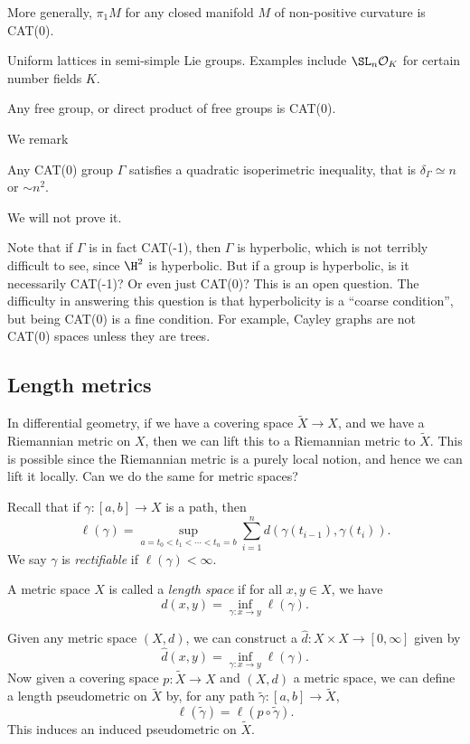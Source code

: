 \documentclass[a4paper]{article}
\begin{document}
\begin{eg}
  More generally, $\pi_1 M$ for any closed manifold $M$ of non-positive curvature is CAT(0).
\end{eg}

\begin{eg}
  Uniform lattices in semi-simple Lie groups. Examples include $\SL_n \mathcal{O}_K$ for certain number fields $K$.
\end{eg}
\begin{eg}
  Any free group, or direct product of free groups is CAT(0).
\end{eg}

We remark
\begin{prop}
  Any CAT(0) group $\Gamma$ satisfies a quadratic isoperimetric inequality, that is $\delta_\Gamma \simeq n$ or $\sim n^2$.
\end{prop}
We will not prove it.

Note that if $\Gamma$ is in fact CAT(-1), then $\Gamma$ is hyperbolic, which is not terribly difficult to see, since $\H^2$ is hyperbolic. But if a group is hyperbolic, is it necessarily CAT(-1)? Or even just CAT(0)? This is an open question. The difficulty in answering this question is that hyperbolicity is a ``coarse condition'', but being CAT(0) is a fine condition. For example, Cayley graphs are not CAT(0) spaces unless they are trees.

\subsection{Length metrics}
In differential geometry, if we have a covering space $\tilde{X} \to X$, and we have a Riemannian metric on $X$, then we can lift this to a Riemannian metric to $\tilde{X}$. This is possible since the Riemannian metric is a purely local notion, and hence we can lift it locally. Can we do the same for metric spaces?

Recall that if $\gamma: [a, b] \to X$ is a path, then
\[
  \ell(\gamma) = \sup_{a = t_0 < t_1 < \cdots < t_n = b} \sum_{i = 1}^n d(\gamma(t_{i - 1}), \gamma(t_i)).
\]
We say $\gamma$ is \emph{rectifiable} if $\ell(\gamma) < \infty$.

\begin{defi}
  A metric space $X$ is called a \emph{length space} if for all $x, y \in X$, we have
  \[
    d(x, y) = \inf_{\gamma: x \to y} \ell(\gamma).
  \]
\end{defi}
Given any metric space $(X, d)$, we can construct a  $\hat{d}: X \times X \to [0, \infty]$ given by
\[
  \hat{d}(x, y) = \inf_{\gamma: x \to y} \ell(\gamma).
\]
Now given a covering space $p: \tilde{X} \to X$ and $(X, d)$ a metric space, we can define a length pseudometric on $\tilde{X}$ by, for any path $\tilde{\gamma}: [a, b] \to \tilde{X}$,
\[
  \ell(\tilde{\gamma}) = \ell(p \circ \tilde{\gamma}).
\]
This induces an induced pseudometric on $\tilde{X}$.
\end{document}

